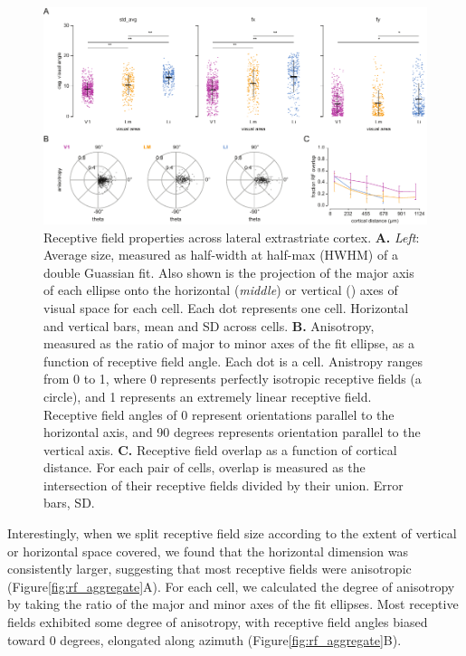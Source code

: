 \begin{figure}[t!]
    \includegraphics[width=\textwidth]{figures/chapter_3/fig_3-4_rf_aggregate/fig_3-4_rf_aggregate.pdf}
    \vspace{.1in}
    \caption[Receptive field properties]{Receptive field properties across lateral extrastriate cortex. 
    \textbf{A.} \textit{Left}: Average size, measured as half-width at half-max (HWHM) of a double Guassian fit. Also shown is the projection of the major axis of each ellipse onto the horizontal (\textit{middle}) or vertical () axes of visual space for each cell. Each dot represents one cell. Horizontal and vertical bars, mean and SD across cells. 
    \textbf{B.} Anisotropy, measured as the ratio of major to minor axes of the fit ellipse, as a function of receptive field angle. Each dot is a cell. Anistropy ranges from 0 to 1, where 0 represents perfectly isotropic receptive fields (a circle), and 1 represents an extremely linear receptive field. Receptive field angles of 0 represent orientations parallel to the horizontal axis, and 90 degrees represents orientation parallel to the vertical axis.
    \textbf{C.} Receptive field overlap as a function of cortical distance. For each pair of cells, overlap is measured as the intersection of their receptive fields divided by their union. Error bars, SD.  
    \label{fig:rf_examples}}
\end{figure}

Interestingly, when we split receptive field size according to the extent of vertical or horizontal space covered, we found that the horizontal dimension was consistently larger, suggesting that most receptive fields were anisotropic (Figure\ref{fig:rf_aggregate}A). For each cell, we calculated the degree of anisotropy by taking the ratio of the major and minor axes of the fit ellipses. Most receptive fields exhibited some degree of anisotropy, with receptive field angles biased toward 0 degrees, elongated along azimuth (Figure\ref{fig:rf_aggregate}B). 

